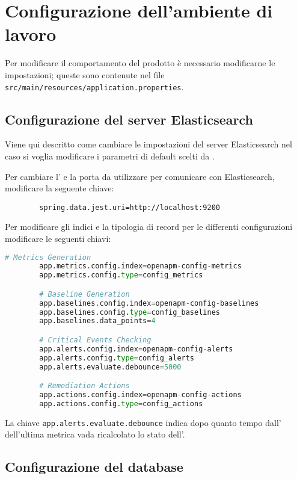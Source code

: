 \section[Configurazione ambiente di lavoro]{Configurazione dell'ambiente di lavoro}
\label{settings}

	Per modificare il comportamento del prodotto è necessario modificarne le impostazioni;
	queste sono contenute nel file \lstinline[columns=fixed]{src/main/resources/application.properties}.


	\subsection{Configurazione del server Elasticsearch}
	
		Viene qui descritto come cambiare le impostazioni del server Elasticsearch nel caso 
		si voglia modificare i parametri di default scelti da \GroupName{}.

		Per cambiare l' e la porta da utilizzare per comunicare con Elasticsearch, modificare la seguente chiave:
		\begin{lstlisting}
		spring.data.jest.uri=http://localhost:9200
		\end{lstlisting}
		
		Per modificare gli indici e la tipologia di record per le differenti configurazioni modificare le seguenti chiavi:
		\begin{lstlisting}[language=Python]
		# Metrics Generation
		app.metrics.config.index=openapm-config-metrics
		app.metrics.config.type=config_metrics

		# Baseline Generation
		app.baselines.config.index=openapm-config-baselines
		app.baselines.config.type=config_baselines
		app.baselines.data_points=4

		# Critical Events Checking
		app.alerts.config.index=openapm-config-alerts
		app.alerts.config.type=config_alerts
		app.alerts.evaluate.debounce=5000

		# Remediation Actions
		app.actions.config.index=openapm-config-actions
		app.actions.config.type=config_actions
		\end{lstlisting}

		La chiave \lstinline[columns=fixed]{app.alerts.evaluate.debounce} indica dopo quanto tempo dall' 
		dell'ultima metrica vada ricalcolato lo stato dell'.

	\subsection{Configurazione del database} \label{impostazionidatabase}
	
